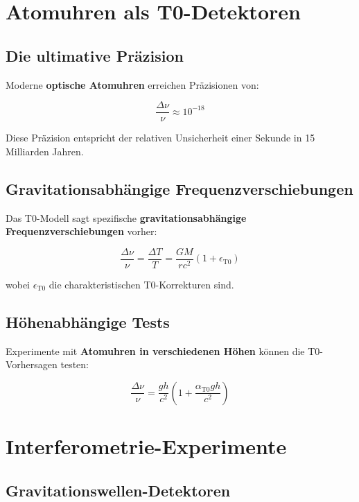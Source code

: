 \documentclass[12pt,a4paper]{report}
\begin{document}
	\section{Atomuhren als T0-Detektoren}
	
	\subsection{Die ultimative Präzision}
	
	Moderne \textbf{optische Atomuhren} erreichen Präzisionen von:
	
	\begin{equation}
		\frac{\Delta\nu}{\nu} \approx 10^{-18}
	\end{equation}
	
	Diese Präzision entspricht der relativen Unsicherheit einer Sekunde in 15 Milliarden Jahren.
	
	\subsection{Gravitationsabhängige Frequenzverschiebungen}
	
	Das T0-Modell sagt spezifische \textbf{gravitationsabhängige Frequenzverschiebungen} vorher:
	
	\begin{equation}
		\frac{\Delta\nu}{\nu} = \frac{\Delta T}{T} = \frac{GM}{rc^2}\left(1 + \epsilon_{\text{T0}}\right)
	\end{equation}
	
	wobei $\epsilon_{\text{T0}}$ die charakteristischen T0-Korrekturen sind.
	
	\subsection{Höhenabhängige Tests}
	
	Experimente mit \textbf{Atomuhren in verschiedenen Höhen} können die T0-Vorhersagen testen:
	
	\begin{equation}
		\frac{\Delta\nu}{\nu} = \frac{gh}{c^2}\left(1 + \frac{\alpha_{\text{T0}}gh}{c^2}\right)
	\end{equation}
	
	\section{Interferometrie-Experimente}
	
	\subsection{Gravitationswellen-Detektoren}
	
\end{document}
